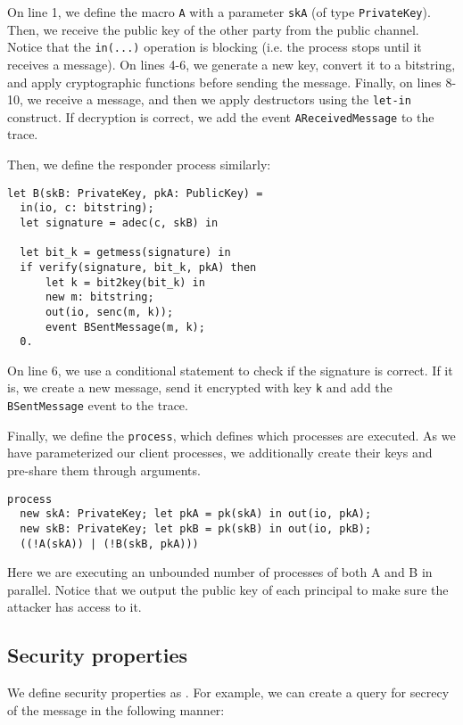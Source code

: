 On line 1, we define the macro \lstinline{A} with a parameter \lstinline{skA} (of type \lstinline{PrivateKey}).
Then, we receive the public key of the other party from the public channel. Notice that the \lstinline{in(...)} operation is blocking (i.e. the process stops until it receives a message).
On lines 4-6, we generate a new key, convert it to a bitstring, and apply cryptographic functions before sending the message.
Finally, on lines 8-10, we receive a message, and then we apply destructors using the \lstinline{let-in} construct. If decryption is correct, we add the event \lstinline{AReceivedMessage} to the trace.

Then, we define the responder process similarly:

\begin{lstlisting}
let B(skB: PrivateKey, pkA: PublicKey) =
  in(io, c: bitstring);
  let signature = adec(c, skB) in

  let bit_k = getmess(signature) in
  if verify(signature, bit_k, pkA) then
      let k = bit2key(bit_k) in
      new m: bitstring;
      out(io, senc(m, k));
      event BSentMessage(m, k);
  0.
\end{lstlisting}

On line 6, we use a conditional statement to check if the signature is correct. If it is, we create a new message, send it encrypted with key \lstinline{k} and add the \lstinline{BSentMessage} event to the trace.

Finally, we define the \lstinline{process}, which defines which processes are executed. As we have parameterized our client processes, we additionally create their keys and pre-share them through arguments.

\begin{lstlisting}
process
  new skA: PrivateKey; let pkA = pk(skA) in out(io, pkA);
  new skB: PrivateKey; let pkB = pk(skB) in out(io, pkB);
  ((!A(skA)) | (!B(skB, pkA)))
\end{lstlisting}

Here we are executing an unbounded number of processes of both A and B in parallel.
Notice that we output the public key of each principal to make sure the attacker has access to it.

\subsection{Security properties}
We define security properties as \Horncs{}. For example, we can create a query for secrecy of the message in the following manner:

